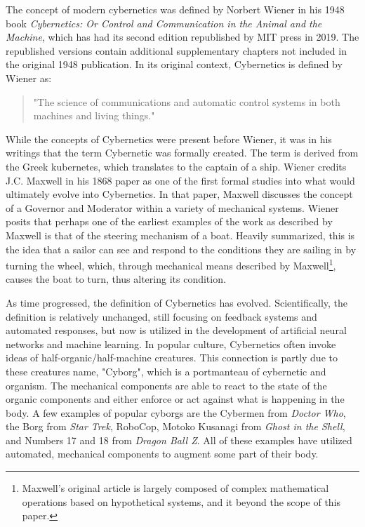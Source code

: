 The concept of modern cybernetics was defined by Norbert Wiener in his 1948 book \textit{Cybernetics: Or Control and Communication in the Animal and the Machine}, which has had its second edition republished by MIT press in 2019\cite{WeinerCybernetics2019}. The republished versions contain additional supplementary chapters not included in the original 1948 publication. In its original context, Cybernetics is defined by Wiener as: 

\begin{quote}
    "The science of communications and automatic control systems in both machines and living things."
\end{quote} 

While the concepts of Cybernetics were present before Wiener, it was in his writings that the term Cybernetic was formally created. The term is derived from the Greek kubernetes, which translates to the captain of a ship\cite{WeinerCybernetics2019}. Wiener credits J.C. Maxwell in his 1868 paper as one of the first formal studies into what would ultimately evolve into Cybernetics. In that paper, Maxwell discusses the concept of a Governor and Moderator within a variety of mechanical systems\cite{maxwellOnGoverners}. Wiener posits that perhaps one of the earliest examples of the work as described by Maxwell is that of the steering mechanism of a boat\cite{WeinerCybernetics2019}. Heavily summarized, this is the idea that a sailor can see and respond to the conditions they are sailing in by turning the wheel, which, through mechanical means described by Maxwell\footnote{Maxwell's original article is largely composed of complex mathematical operations based on hypothetical systems, and it beyond the scope of this paper.}, causes the boat to turn, thus altering its condition.

As time progressed, the definition of Cybernetics has evolved. Scientifically, the definition is relatively unchanged, still focusing on feedback systems and automated responses, but now is utilized in the development of artificial neural networks and machine learning\cite{Cariani2010}. In popular culture, Cybernetics often invoke ideas of half-organic/half-machine creatures. This connection is partly due to these creatures name, "Cyborg", which is a portmanteau of cybernetic and organism. The mechanical components are able to react to the state of the organic components and either enforce or act against what is happening in the body. A few examples of popular cyborgs are the Cybermen from \textit{Doctor Who}, the Borg from \textit{Star Trek}, RoboCop, Motoko Kusanagi from \textit{Ghost in the Shell}, and Numbers 17 and 18 from \textit{Dragon Ball Z}. All of these examples have utilized automated, mechanical components to augment some part of their body.

